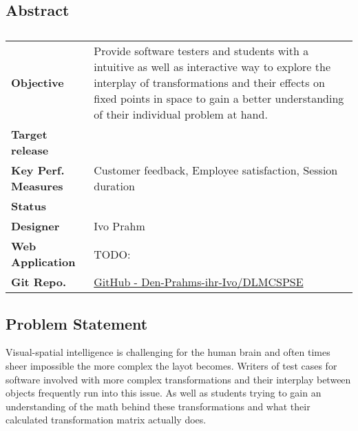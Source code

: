 \subsection{Abstract}

\bgroup
\def\arraystretch{1.5}
\setlength\arrayrulewidth{1.2pt}
\color{default}
\begin{xltabular}{\textwidth}{|p{3cm}|X|}
\caption*{} \label{tab:Abstract} \\
\hline

 \textbf{Objective} & {\color{textgray} Provide software testers and students with a intuitive as well as interactive way to explore the interplay of transformations and their effects on fixed points in space to gain a better understanding of their individual problem at hand.} \\ \hline 

 \textbf{Target release} &  \\ \hline 

 \textbf{Key Perf. Measures} & {\color{textgray} Customer feedback, Employee satisfaction, Session duration} \\ \hline 

 \textbf{Status} &  \\ \hline 

 \textbf{Designer} & {\color{textgray} Ivo Prahm} \\ \hline 
{} \textbf{Web Application} & {\color{textgray} TODO:} \\ \hline 
{} \textbf{Git Repo.} & {\color{textblue} \href{https://github.com/Den-Prahms-ihr-Ivo/DLMCSPSE}{GitHub - Den-Prahms-ihr-Ivo/DLMCSPSE } } \\ \hline 


\end{xltabular} 
\egroup 
\color{default}


\subsection{Problem Statement}
Visual-spatial intelligence is challenging for the human brain and often times sheer impossible the more complex the layot becomes. Writers of test cases for software involved with more complex transformations and their interplay between objects frequently run into this issue. As well as students trying to gain an understanding of the math behind these transformations and what their calculated transformation matrix actually does.

